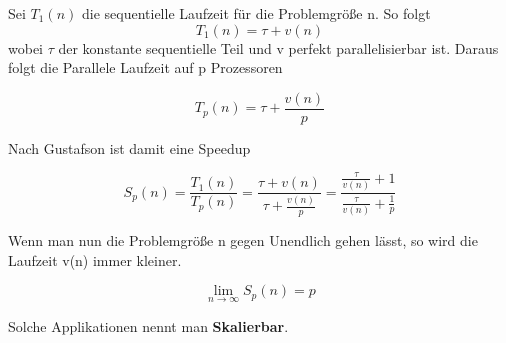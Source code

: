 \documentclass[twocolumn, a4paper, 10pt, DIV12]{scrreprt}
\begin{document}
Sei \(T_1(n)\) die sequentielle Laufzeit für die Problemgröße n. So folgt
\[ T_1(n) = \tau + v(n)\]
wobei \(\tau\) der konstante sequentielle Teil und v perfekt parallelisierbar ist. Daraus folgt die
Parallele Laufzeit auf p Prozessoren

\[ T_p(n) = \tau + \frac{v(n)}{p}\]

Nach Gustafson ist damit eine Speedup

\[ S_p(n) = \frac{T_1(n)}{T_p(n)} = \frac{\tau + v(n)}{\tau + \frac{v(n)}{p}} = \frac{\frac{\tau}{v(n)} + 1}{\frac{\tau}{v(n)} + \frac{1}{p}} \]

Wenn man nun die Problemgröße n gegen Unendlich gehen lässt, so wird die Laufzeit v(n) immer kleiner.

\[ \lim_{n \rightarrow \infty} S_p(n) = p\]

Solche Applikationen nennt man \textbf{Skalierbar}.
\end{document}
